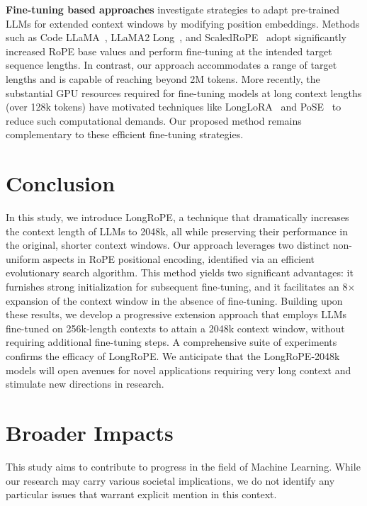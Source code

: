 \textbf{Fine-tuning based approaches} investigate strategies to adapt pre-trained LLMs for extended context windows by modifying position embeddings. Methods such as Code LLaMA~\cite{codellama}, LLaMA2 Long~\cite{xiong2023effective}, and ScaledRoPE~\cite{liu2023scaling} adopt significantly increased RoPE base values and perform fine-tuning at the intended target sequence lengths. In contrast, our approach accommodates a range of target lengths and is capable of reaching beyond 2M tokens. More recently, the substantial GPU resources required for fine-tuning models at long context lengths (over 128k tokens) have motivated techniques like LongLoRA~\cite{longlora} and PoSE~\cite{zhu2023pose} to reduce such computational demands. Our proposed method remains complementary to these efficient fine-tuning strategies.

\section{Conclusion}

In this study, we introduce LongRoPE, a technique that dramatically increases the context length of LLMs to 2048k, all while preserving their performance in the original, shorter context windows. Our approach leverages two distinct non-uniform aspects in RoPE positional encoding, identified via an efficient evolutionary search algorithm. This method yields two significant advantages: it furnishes strong initialization for subsequent fine-tuning, and it facilitates an 8$\times$ expansion of the context window in the absence of fine-tuning. Building upon these results, we develop a progressive extension approach that employs LLMs fine-tuned on 256k-length contexts to attain a 2048k context window, without requiring additional fine-tuning steps. A comprehensive suite of experiments confirms the efficacy of LongRoPE. We anticipate that the LongRoPE-2048k models will open avenues for novel applications requiring very long context and stimulate new directions in research.

\section*{Broader Impacts} This study aims to contribute to progress in the field of Machine Learning. While our research may carry various societal implications, we do not identify any particular issues that warrant explicit mention in this context.

	\balance


